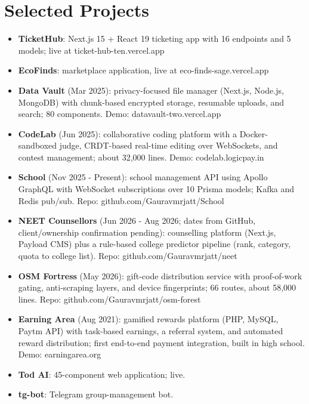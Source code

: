 \documentclass[11pt,a4paper,sans]{moderncv}
\begin{document}
\section{Selected Projects}
\vspace{1pt}
\begin{itemize}
    \item {\textbf{TicketHub}: Next.js 15 + React 19 ticketing app with 16 endpoints and 5 models; live at ticket-hub-ten.vercel.app}
    \item {\textbf{EcoFinds}: marketplace application, live at eco-finds-sage.vercel.app}
    \item {\textbf{Data Vault} (Mar 2025): privacy-focused file manager (Next.js, Node.js, MongoDB) with chunk-based encrypted storage, resumable uploads, and search; 80 components. Demo: datavault-two.vercel.app}
    \item {\textbf{CodeLab} (Jun 2025): collaborative coding platform with a Docker-sandboxed judge, CRDT-based real-time editing over WebSockets, and contest management; about 32,000 lines. Demo: codelab.logicpay.in}
    \item {\textbf{School} (Nov 2025 - Present): school management API using Apollo GraphQL with WebSocket subscriptions over 10 Prisma models; Kafka and Redis pub/sub. Repo: github.com/Gauravmrjatt/School}
    \item {\textbf{NEET Counsellors} (Jun 2026 - Aug 2026; dates from GitHub, client/ownership confirmation pending): counselling platform (Next.js, Payload CMS) plus a rule-based college predictor pipeline (rank, category, quota to college list). Repo: github.com/Gauravmrjatt/neet}
    \item {\textbf{OSM Fortress} (May 2026): gift-code distribution service with proof-of-work gating, anti-scraping layers, and device fingerprints; 66 routes, about 58,000 lines. Repo: github.com/Gauravmrjatt/osm-forest}
    \item {\textbf{Earning Area} (Aug 2021): gamified rewards platform (PHP, MySQL, Paytm API) with task-based earnings, a referral system, and automated reward distribution; first end-to-end payment integration, built in high school. Demo: earningarea.org}
\item {\textbf{Tod AI}: 45-component web application; live.}
\item {\textbf{tg-bot}: Telegram group-management bot.}
\end{itemize}

\end{document}
